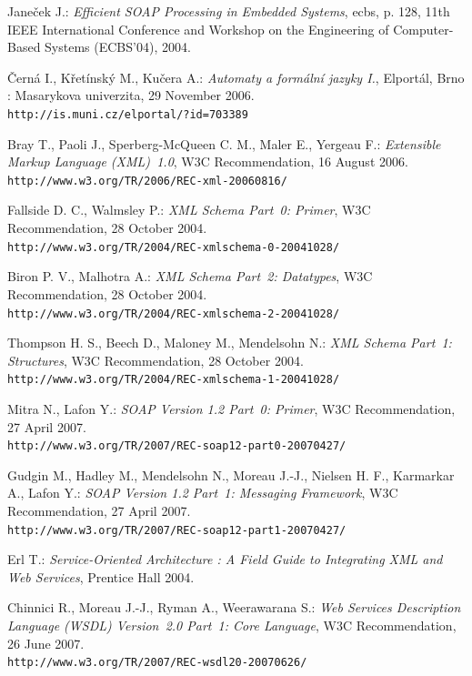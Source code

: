 \documentclass[12pt,notitlepage]{report}
\begin{document}
\begin{thebibliography}{99}

Janeček J.: \textit{Efficient SOAP Processing in Embedded Systems}, ecbs, p. 128, 11th IEEE International Conference and Workshop on the Engineering of Computer-Based Systems (ECBS'04), 2004.

Černá I., Křetínský M., Kučera A.: \textit{Automaty a formální jazyky I.}, Elportál, Brno : Masarykova univerzita, 29 November 2006.\\ \texttt{http://is.muni.cz/elportal/?id=703389}

Bray T., Paoli J., Sperberg-McQueen C. M., Maler E., Yergeau F.: \textit{Extensible Markup Language (XML)~1.0}, W3C Recommendation, 16 August 2006.\\ \texttt{http://www.w3.org/TR/2006/REC-xml-20060816/}

Fallside D. C., Walmsley P.: \textit{XML Schema Part~0: Primer}, W3C Recommendation, 28 October 2004.\\
\texttt{http://www.w3.org/TR/2004/REC-xmlschema-0-20041028/}

Biron P. V., Malhotra A.: \textit{XML Schema Part~2: Datatypes}, W3C Recommendation, 28 October 2004.\\
\texttt{http://www.w3.org/TR/2004/REC-xmlschema-2-20041028/}

Thompson H. S., Beech D., Maloney M., Mendelsohn N.: \textit{XML Schema Part~1: Structures}, W3C Recommendation, 28 October 2004.\\ 
\texttt{http://www.w3.org/TR/2004/REC-xmlschema-1-20041028/}

Mitra N., Lafon Y.: \textit{SOAP Version 1.2 Part~0: Primer}, W3C Recommendation, 27 April 2007.\\
\texttt{http://www.w3.org/TR/2007/REC-soap12-part0-20070427/}

Gudgin M., Hadley M., Mendelsohn N., Moreau J.-J., Nielsen H. F., Karmarkar A., Lafon Y.: \textit{SOAP Version 1.2 Part~1: Messaging Framework}, W3C Recommendation, 27 April 2007.\\ \texttt{http://www.w3.org/TR/2007/REC-soap12-part1-20070427/}

Erl T.: \textit{Service-Oriented Architecture : A Field Guide to Integrating XML and Web Services}, Prentice Hall 2004.

Chinnici R., Moreau J.-J., Ryman A., Weerawarana S.: \textit{Web Services Description Language (WSDL) Version~2.0 Part~1: Core Language}, W3C Recommendation, 26 June 2007.\\ \texttt{http://www.w3.org/TR/2007/REC-wsdl20-20070626/}


\end{thebibliography}
\end{document}

